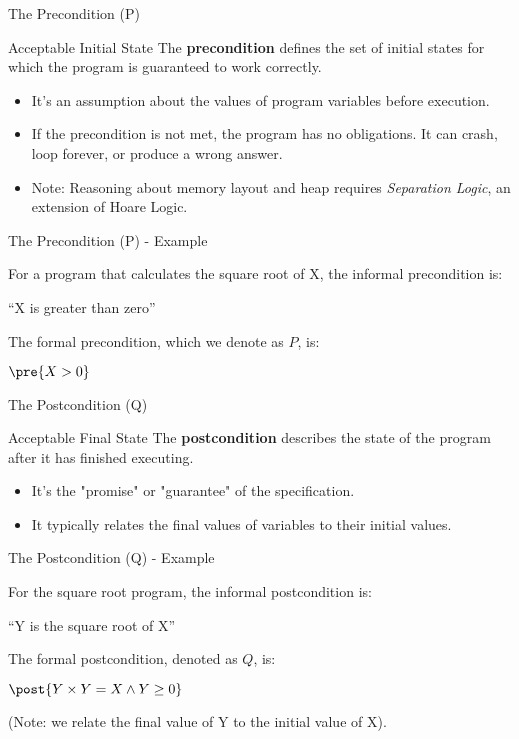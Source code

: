 \begin{frame}{The Precondition (P)}
    \begin{block}{Acceptable Initial State}
        The \textbf{precondition} defines the set of initial states for which the program is guaranteed to work correctly.
        \begin{itemize}
            \item It's an assumption about the values of program variables before execution.
            \item If the precondition is not met, the program has no obligations. It can crash, loop forever, or produce a wrong answer.
            \item Note: Reasoning about memory layout and heap requires \emph{Separation Logic}, an extension of Hoare Logic.
        \end{itemize}
    \end{block}
\end{frame}
\begin{frame}{The Precondition (P) - Example}


    \begin{example}
        For a program that calculates the square root of X, the informal precondition is:
        \begin{center}
            ``X is greater than zero''
        \end{center}
        The formal precondition, which we denote as $P$, is:
        \begin{center}
            $\pre{X > 0}$
        \end{center}
    \end{example}
\end{frame}

\begin{frame}{The Postcondition (Q)}
    \begin{block}{Acceptable Final State}
        The \textbf{postcondition} describes the state of the program after it has finished executing.
        \begin{itemize}
            \item It's the "promise" or "guarantee" of the specification.
            \item It typically relates the final values of variables to their initial values.
        \end{itemize}
    \end{block}
\end{frame}
\begin{frame}{The Postcondition (Q) - Example}
    \begin{example}
        For the square root program, the informal postcondition is:
        \begin{center}
            ``Y is the square root of X''
        \end{center}
        The formal postcondition, denoted as $Q$, is:
        \begin{center}
            $\post{Y \times Y = X \wedge Y \ge 0}$
        \end{center}
        (Note: we relate the final value of Y to the initial value of X).
    \end{example}
\end{frame}

